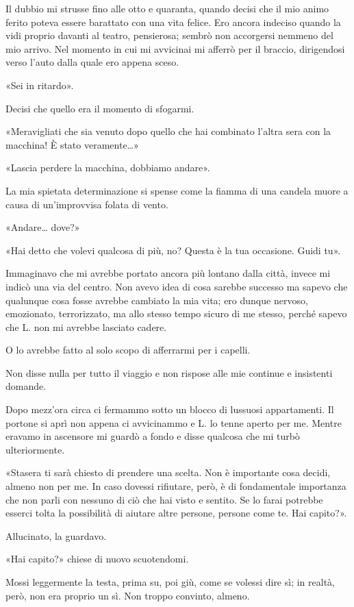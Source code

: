 \documentclass[a4paper,10pt]{memoir}
\begin{document}
Il dubbio mi strusse fino alle otto e quaranta, quando decisi che il mio animo ferito poteva essere barattato con una
vita felice. Ero ancora indeciso quando la vidi proprio davanti al teatro, pensierosa; sembrò non accorgersi nemmeno del
mio arrivo. Nel momento in cui mi avvicinai mi afferrò per il braccio, dirigendosi verso l'auto dalla quale ero appena
sceso.

«Sei in ritardo».

Decisi che quello era il momento di sfogarmi.

«Meravigliati che sia venuto dopo quello che hai combinato l'altra sera con la macchina! È stato veramente\dots{}»

«Lascia perdere la macchina, dobbiamo andare».

La mia spietata determinazione si spense come la fiamma di una candela muore a causa di un'improvvisa folata di vento.

«Andare\dots{} dove?»

«Hai detto che volevi qualcosa di più, no? Questa è la tua occasione. Guidi tu».

Immaginavo che mi avrebbe portato ancora più lontano dalla città, invece mi indicò una via del centro. Non avevo idea di
cosa sarebbe successo ma sapevo che qualunque cosa fosse avrebbe cambiato la mia vita; ero dunque nervoso, emozionato,
terrorizzato, ma allo stesso tempo sicuro di me stesso, perché sapevo che L. non mi avrebbe lasciato cadere.

O lo avrebbe fatto al solo scopo di afferrarmi per i capelli.

Non disse nulla per tutto il viaggio e non rispose alle mie continue e insistenti domande.

Dopo mezz'ora circa ci fermammo sotto un blocco di lussuosi appartamenti. Il portone si aprì non appena ci avvicinammo e
L. lo tenne aperto per me. Mentre eravamo in ascensore mi guardò a fondo e disse qualcosa che mi turbò ulteriormente.

«Stasera ti sarà chiesto di prendere una scelta. Non è importante cosa decidi, almeno non per me. In caso dovessi
rifiutare, però, è di fondamentale importanza che non parli con nessuno di ciò che hai visto e sentito. Se lo farai
potrebbe esserci tolta la possibilità di aiutare altre persone, persone come te. Hai capito?».

Allucinato, la guardavo.

«Hai capito?» chiese di nuovo scuotendomi.

Mossi leggermente la testa, prima su, poi giù, come se volessi dire sì; in realtà, però, non era proprio un sì. Non
troppo convinto, almeno.
\end{document}
